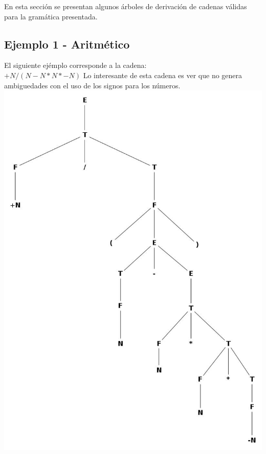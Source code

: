 En esta secci\'on se presentan algunos \'arboles de derivaci\'on de cadenas v\'alidas para la gram\'atica presentada.\\

\subsection{Ejemplo 1 - Aritm\'etico}
El siguiente ej\'emplo corresponde a la cadena:\\
$+N / (N-N*N*-N)$
Lo interesante de esta cadena es ver que no genera ambiguedades con el uso de los signos para los n\'umeros.
\includegraphics[scale=0.40]{arboles_derivacion/ejemplo1.jpg}
